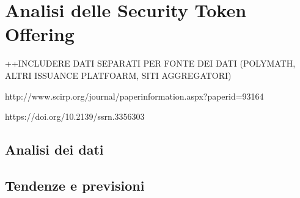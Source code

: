 \chapter{Analisi delle Security Token Offering}
++INCLUDERE DATI SEPARATI PER FONTE DEI DATI (POLYMATH, ALTRI ISSUANCE PLATFOARM, SITI AGGREGATORI)


http://www.scirp.org/journal/paperinformation.aspx?paperid=93164

https://doi.org/10.2139/ssrn.3356303

\section{Analisi dei dati}

\section{Tendenze e previsioni}